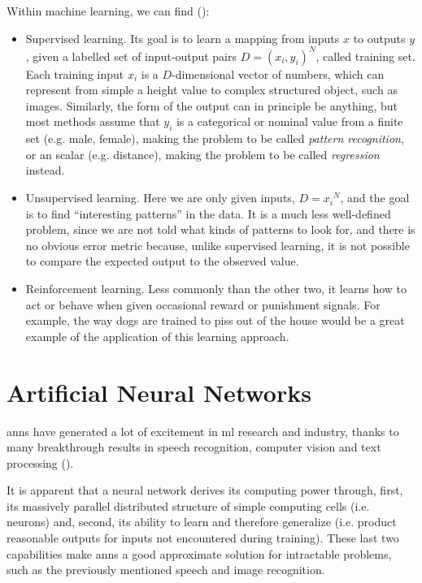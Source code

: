 Within machine learning, we can find (\cite{kevin_p_murphy_book}):
\begin{itemize}
	\item Supervised learning. Its goal is to learn a mapping from inputs $x$ to outputs $y$, given a labelled set of input-output pairs $D={(x_i ,y_i)}^N$, called training set. Each training input $x_i$ is a $D$-dimensional vector of numbers, which can represent from simple a height value to complex structured object, such as images. Similarly, the form of the output can in principle be anything, but most methods assume that $y_i$ is a categorical or nominal value from a finite set (e.g. male, female), making the problem to be called \textit{pattern recognition}, or an scalar (e.g. distance), making the problem to be called \textit{regression} instead.  

	\item Unsupervised learning. Here we are only given inputs, $D={x_i}^N$, and the goal is to find “interesting patterns” in the data. It is a much less well-defined problem, since we are not told what kinds of patterns to look for, and there is no obvious error metric because, unlike supervised learning, it is not possible to compare the expected output to the observed value. 

	\item Reinforcement learning. Less commonly than the other two, it learns how to act or behave when given occasional reward or punishment signals. For example, the way dogs are trained to piss out of the house would be a great example of the application of this learning approach.  
\end{itemize}


                                        

\section{Artificial Neural Networks}
\glspl{ann} have generated a lot of excitement in \gls{ml} research and industry, thanks to many breakthrough results in speech recognition, computer vision and text processing (\cite{intro_ann}). 

It is apparent that a neural network derives its computing power through, first, its massively parallel distributed structure of simple computing cells (i.e. neurons) and, second, its ability to learn and therefore generalize (i.e. product reasonable outputs for inputs not encountered during training). These last two capabilities make \glspl{ann} a good approximate solution for intractable problems, such as the previously mentioned speech and image recognition.

